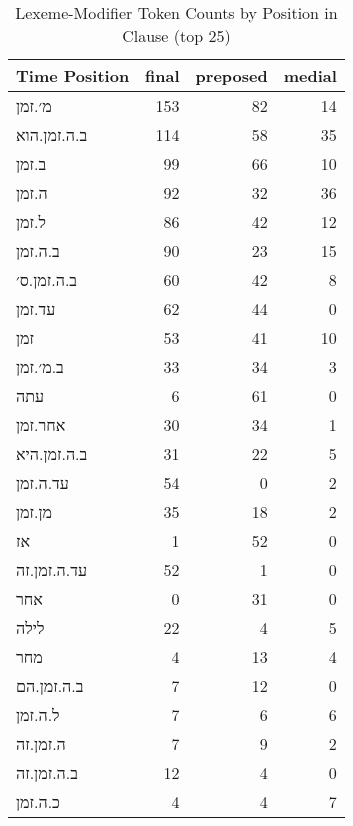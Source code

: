 \begin{table}[htbp!]
\centering
\caption{Lexeme-Modifier Token Counts by Position in Clause (top 25)}
\label{table:poslt_ct_25}
\begin{tabular}{lrrr}
\toprule
Time Position &  final &  preposed &  medial \\
\midrule
\texthebrew{מ׳.זמן}      &    153 &        82 &      14 \\
\texthebrew{ב.ה.זמן.הוא} &    114 &        58 &      35 \\
\texthebrew{ב.זמן}       &     99 &        66 &      10 \\
\texthebrew{ה.זמן}       &     92 &        32 &      36 \\
\texthebrew{ל.זמן}       &     86 &        42 &      12 \\
\texthebrew{ב.ה.זמן}     &     90 &        23 &      15 \\
\texthebrew{ב.ה.זמן.ס׳}  &     60 &        42 &       8 \\
\texthebrew{עד.זמן}      &     62 &        44 &       0 \\
\texthebrew{זמן}         &     53 &        41 &      10 \\
\texthebrew{ב.מ׳.זמן}    &     33 &        34 &       3 \\
\texthebrew{עתה}         &      6 &        61 &       0 \\
\texthebrew{אחר.זמן}     &     30 &        34 &       1 \\
\texthebrew{ב.ה.זמן.היא} &     31 &        22 &       5 \\
\texthebrew{עד.ה.זמן}    &     54 &         0 &       2 \\
\texthebrew{מן.זמן}      &     35 &        18 &       2 \\
\texthebrew{אז}          &      1 &        52 &       0 \\
\texthebrew{עד.ה.זמן.זה} &     52 &         1 &       0 \\
\texthebrew{אחר}         &      0 &        31 &       0 \\
\texthebrew{לילה}        &     22 &         4 &       5 \\
\texthebrew{מחר}         &      4 &        13 &       4 \\
\texthebrew{ב.ה.זמן.הם}  &      7 &        12 &       0 \\
\texthebrew{ל.ה.זמן}     &      7 &         6 &       6 \\
\texthebrew{ה.זמן.זה}    &      7 &         9 &       2 \\
\texthebrew{ב.ה.זמן.זה}  &     12 &         4 &       0 \\
\texthebrew{כ.ה.זמן}     &      4 &         4 &       7 \\
\bottomrule
\end{tabular}
\end{table}
